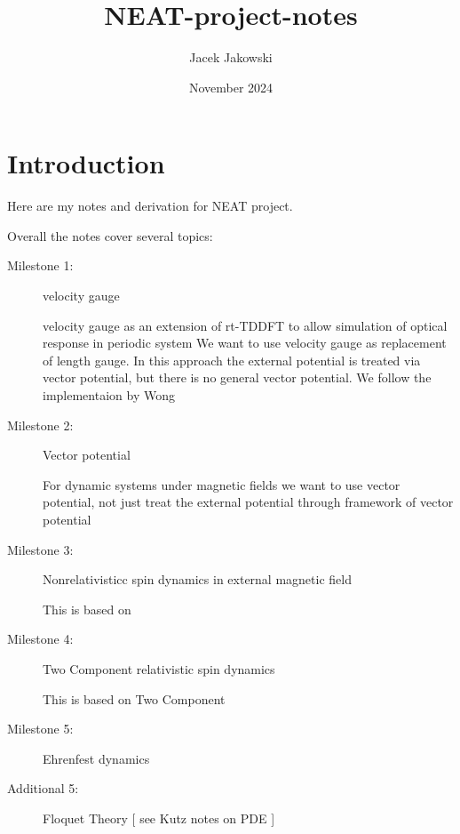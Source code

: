 \documentclass[11pt]{article}
\title{NEAT-project-notes}
\author{Jacek Jakowski}
\date{November 2024}
\begin{document}
\maketitle

\maketitle

\setcounter{tocdepth}{5}
\tableofcontents

\section{Introduction}

Here are my notes and derivation for NEAT project.

Overall the notes cover several topics:
 \begin{description}
     
\item[ Milestone 1: ]   velocity gauge 

 velocity gauge as an extension of rt-TDDFT to allow simulation of optical response  in periodic system  
 We want to use velocity gauge as replacement of length  gauge. 
 In this approach the external potential is treated via vector potential, but there is no general vector potential. 
 We follow  the implementaion  by Wong \cite{rt-DFTB-Wong-2023}
 

\item[ Milestone 2: ]  Vector potential  

 For dynamic systems under magnetic  fields  we want to use vector  potential, not just  treat the external potential through framework of vector potential


\item[ Milestone 3:]   Nonrelativisticc  spin dynamics in external magnetic field

 This is based on  \cite{spin-rt-tddft-Li-2014}

   

\item[ Milestone 4:]  Two Component relativistic spin dynamics

 This is based on  Two Component\cite{spin-rt-tddft-Li-2016}

\item[ Milestone 5:]  Ehrenfest  dynamics 
  
   
\item[ Additional  5:] Floquet Theory [ see Kutz notes on PDE ] 
 \end{description}
\end{document}
